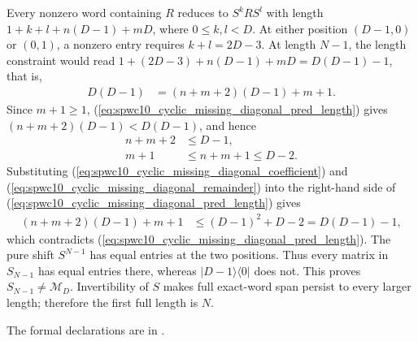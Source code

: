 \documentclass{article}
\begin{document}
Every nonzero word containing $R$ reduces to $S^kRS^l$ with length
$1+k+l+n(D-1)+mD$, where $0\le k,l<D$.
At either position $(D-1,0)$ or $(0,1)$, a nonzero entry requires
$k+l=2D-3$. At length $N-1$, the length constraint would read
$1+(2D-3)+n(D-1)+mD=D(D-1)-1$, that is,
\begin{align}
    D(D-1)
    &=(n+m+2)(D-1)+m+1.
    \label{eq:spwc10_cyclic_missing_diagonal_pred_length}
\end{align}
Since $m+1\ge1$, (\ref{eq:spwc10_cyclic_missing_diagonal_pred_length})
gives $(n+m+2)(D-1)<D(D-1)$, and hence
\begin{align}
    n+m+2
    &\le D-1,
    \label{eq:spwc10_cyclic_missing_diagonal_coefficient}\\
    m+1
    &\le n+m+1
     \le D-2.
    \label{eq:spwc10_cyclic_missing_diagonal_remainder}
\end{align}
Substituting (\ref{eq:spwc10_cyclic_missing_diagonal_coefficient}) and
(\ref{eq:spwc10_cyclic_missing_diagonal_remainder}) into the right-hand side
of (\ref{eq:spwc10_cyclic_missing_diagonal_pred_length}) gives
\begin{align}
    (n+m+2)(D-1)+m+1
    &\le(D-1)^2+D-2
     =D(D-1)-1,
    \label{eq:spwc10_cyclic_missing_diagonal_contradiction}
\end{align}
which contradicts (\ref{eq:spwc10_cyclic_missing_diagonal_pred_length}).
The pure shift $S^{N-1}$ has equal entries at the two positions.
Thus every matrix in $S_{N-1}$ has equal entries there, whereas
$|D-1\rangle\langle0|$ does not. This proves $S_{N-1}\ne\mathcal M_D$.
Invertibility of $S$ makes full exact-word span persist to every
larger length; therefore the first full length is $N$.

The formal declarations are in
.



\end{document}
